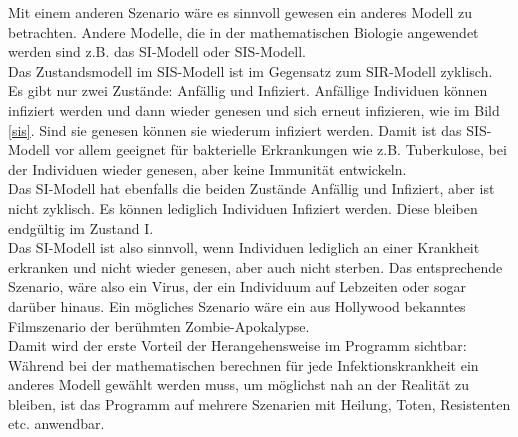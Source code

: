 Mit einem anderen Szenario wäre es sinnvoll gewesen ein anderes Modell zu betrachten. 
Andere Modelle, die in der mathematischen Biologie angewendet werden sind z.B. das SI-Modell oder SIS-Modell.\\
Das Zustandsmodell im SIS-Modell ist im Gegensatz zum SIR-Modell zyklisch. Es gibt nur zwei Zustände: Anfällig und Infiziert. Anfällige Individuen können infiziert werden und dann wieder genesen und sich erneut infizieren, wie im Bild \ref{sis}. Sind sie genesen können sie wiederum infiziert werden. Damit ist das SIS-Modell vor allem geeignet für bakterielle Erkrankungen wie z.B. Tuberkulose, bei der Individuen wieder genesen, aber keine Immunität entwickeln. \\
Das SI-Modell hat ebenfalls die beiden Zustände Anfällig und Infiziert, aber ist nicht zyklisch. Es können lediglich Individuen Infiziert werden. Diese bleiben endgültig im Zustand I.\\ 
Das SI-Modell ist also sinnvoll, wenn Individuen lediglich an einer Krankheit erkranken und nicht wieder genesen, aber auch nicht sterben. Das entsprechende Szenario, wäre also ein Virus, der ein Individuum auf Lebzeiten oder sogar darüber hinaus. Ein mögliches Szenario wäre ein aus Hollywood bekanntes Filmszenario der berühmten Zombie-Apokalypse.\\
Damit wird der erste Vorteil der Herangehensweise im Programm sichtbar: Während bei der mathematischen berechnen für jede Infektionskrankheit ein anderes Modell gewählt werden muss, um möglichst nah an der Realität zu bleiben, ist das Programm auf mehrere Szenarien mit Heilung, Toten, Resistenten etc. anwendbar.